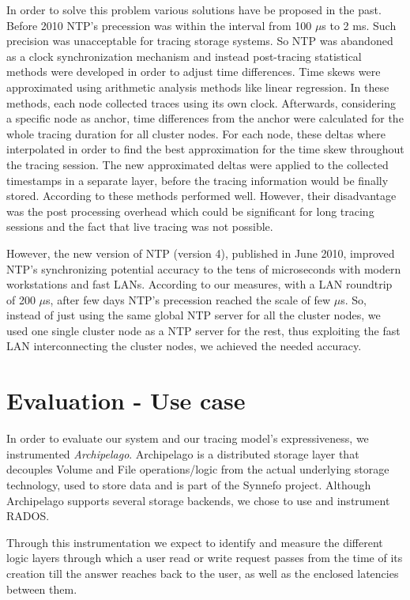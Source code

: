 \documentclass[a4paper,10pt,twocolumn]{article}
\begin{document}
In order to solve this problem various solutions have be proposed in the past.
Before 2010 NTP's precession was within the interval from 100 $\mu$s to 2 ms.
Such precision was unacceptable for tracing storage systems. So NTP was
abandoned as a clock synchronization mechanism and instead post-tracing
statistical methods were developed in order to adjust time differences. Time
skews were approximated using arithmetic analysis methods like linear
regression. In these methods, each node collected traces using its own clock.
Afterwards, considering a specific node as anchor, time differences from the
anchor were calculated for the whole tracing duration for all cluster nodes.
For each node, these deltas where interpolated in order to find the best
approximation for the time skew throughout the tracing session. The new
approximated deltas were applied to the collected timestamps in a separate
layer, before the tracing information would be finally stored. According to
\cite{hp} these methods performed well. However, their disadvantage was the post
processing overhead which could be significant for long tracing sessions and the
fact that live tracing was not possible.

However, the new version of NTP (version 4), published in June 2010, improved
NTP's synchronizing potential accuracy to the tens of microseconds with modern
workstations and fast LANs. According to our measures, with a LAN roundtrip of
200 $\mu$s, after few days NTP's precession reached the scale of few $\mu$s.
So, instead of just using the same global NTP server for all the cluster nodes,
we used one single cluster node as a NTP server for the rest, thus exploiting
the fast LAN interconnecting the cluster nodes, we achieved the needed accuracy.
 
\section{Evaluation - Use case}

In order to evaluate our system and our tracing model's expressiveness, we
instrumented \emph{Archipelago}\cite{archip}. Archipelago is a distributed
storage layer that decouples Volume and File operations/logic from the actual
underlying storage technology, used to store data and is part of the Synnefo
project\cite{synnefo}. Although Archipelago supports several storage backends,
we chose to use and instrument RADOS\cite{rados}. 

Through this instrumentation we expect to identify and measure the different
logic layers through which a user read or write request passes from the time of
its creation till the answer reaches back to the user, as well as the enclosed
latencies between them.
\end{document}
